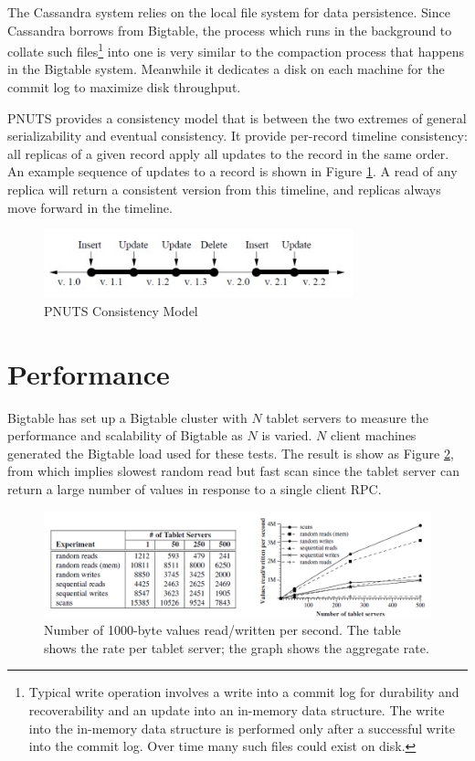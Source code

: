\documentclass[12pt,letter]{article}
\begin{document}
The Cassandra system relies on the local file system for data persistence. Since Cassandra borrows from Bigtable, the process which runs in the background to collate such files\footnote{Typical write operation involves a write into a commit log for durability and recoverability and an update into an in-memory data structure. The write into the in-memory data structure is performed only after a successful write into the commit log. Over time many such files could exist on disk.} into one is very similar to the compaction process that happens in the Bigtable system. Meanwhile it dedicates a disk on each machine for the commit log to maximize disk throughput.\citep{LakshamAvinash2010}

PNUTS provides a consistency model that is between the two extremes of general serializability and eventual consistency. It provide per-record timeline consistency: all replicas of a given record apply all updates to the record in the same order. An example sequence of updates to a record is shown in Figure \ref{fig:pnuts-1}. A read of any replica will return a consistent version from this timeline, and replicas always move forward in the timeline.

\begin{figure}[htbp]
\centering
\includegraphics[width=0.8\textwidth]{fig/pnuts-1}
\caption{PNUTS Consistency Model}
\label{fig:pnuts-1}
\end{figure}

\section{Performance}
Bigtable has set up a Bigtable cluster with $N$ tablet servers to measure the performance and scalability of Bigtable as $N$ is varied. $N$ client machines generated the Bigtable load used for these tests. The result is show as Figure \ref{fig:bigtable}, from which implies slowest random read but fast scan since the tablet server can return a large number of values in response to a single client RPC.

\begin{figure}[htbp]
\centering
\includegraphics[width=\textwidth]{fig/bigtable}
\caption{Number of 1000-byte values read/written per second. The table shows the rate per tablet server; the graph shows the aggregate rate.}
\label{fig:bigtable}
\end{figure}
\end{document}
